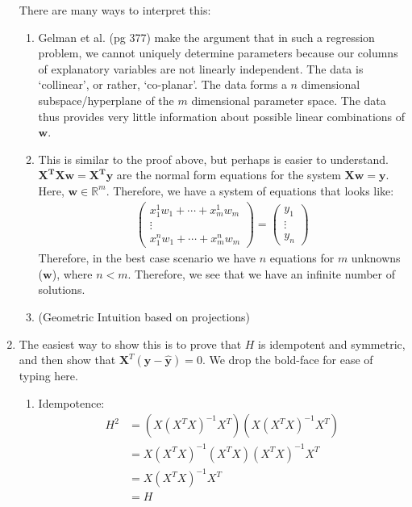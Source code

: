 \documentclass[submit]{harvardml}
\renewcommand{\v}{\boldsymbol}
\begin{document}
\begin{enumerate}[label=(\alph*)]
	There are many ways to interpret this:
	\begin{enumerate}[label=(\roman*)]
		\item Gelman et al. (pg 377) make the argument that in such a regression problem, we cannot uniquely determine parameters because our columns of explanatory variables are not linearly independent. The data is `collinear', or rather, `co-planar'. The data forms a $n$ dimensional subspace/hyperplane of the $m$ dimensional parameter space. The data thus provides very little information about possible linear combinations of $\v{w}$. 
		\item This is similar to the proof above, but perhaps is easier to understand. $\v{X^T X} \v{w} = \v{X^T} \v{y}$ are the normal form equations for the system $\v{X} \v{w} = \v{y}$. Here, $\v{w} \in \mathbb{R}^m$. Therefore, we have a system of equations that looks like:
			\begin{align*}
				\begin{pmatrix}
					x^{1}_1 w_1 + \cdots + x^{1}_m w_m \\
					\vdots \\
					x^{n}_1 w_1 + \cdots + x^{n}_m w_m
				\end{pmatrix} = \begin{pmatrix}
				y_1 \\ \vdots \\ y_n
				\end{pmatrix}
			\end{align*}
			Therefore, in the best case scenario we have $n$ equations for $m$ unknowns ($\v{w}$), where $n<m$. Therefore, we see that we have an infinite number of solutions.
		\item (Geometric Intuition based on projections) 
	\end{enumerate}
	
	\item The easiest way to show this is to prove that $H$ is idempotent and symmetric, and then show that $\v{X}^T (\v{y} - \v{\hat{y}}) = 0$. We drop the bold-face for ease of typing here.
	\begin{enumerate}[label=(\roman*)]
		\item Idempotence: 
			\begin{align*}
				H^2 &= (X (X^T X)^{-1}X^T ) (X (X^T X)^{-1}X^T ) \\
					&= X (X^T X)^{-1}(X^T X) (X^T X)^{-1} X^T \\
					&= X (X^T X)^{-1}X^T \\
					&= H
			\end{align*}
		

\end{enumerate}
\end{enumerate}
\end{document}
